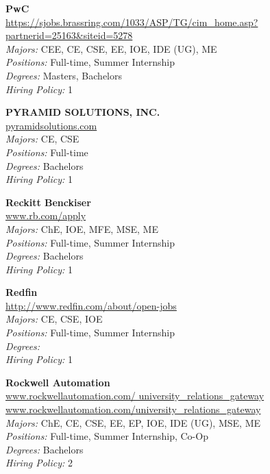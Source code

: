 \documentclass{article}
\begin{document}
\begin{center}
\begin{multicols}{3}
\begin{minipage}{.9\columnwidth}{\Large\bf PwC }\\
	\url{https://sjobs.brassring.com/1033/ASP/TG/cim_home.asp?partnerid=25163&siteid=5278}\\
	\emph{Majors:} CEE, CE, CSE, EE, IOE, IDE (UG), ME\\
	\emph{Positions:} Full-time, Summer Internship\\
	\emph{Degrees:} Masters, Bachelors\\
	\emph{Hiring Policy:} 1\\
\end{minipage}
 
\begin{minipage}{.9\columnwidth}{\Large\bf PYRAMID SOLUTIONS, INC. }\\
	\url{pyramidsolutions.com}\\
	\emph{Majors:} CE, CSE\\
	\emph{Positions:} Full-time\\
	\emph{Degrees:} Bachelors\\
	\emph{Hiring Policy:} 1\\
\end{minipage}
 
\begin{minipage}{.9\columnwidth}{\Large\bf Reckitt Benckiser }\\
	\url{www.rb.com/apply}\\
	\emph{Majors:} ChE, IOE, MFE, MSE, ME\\
	\emph{Positions:} Full-time, Summer Internship\\
	\emph{Degrees:} Bachelors\\
	\emph{Hiring Policy:} 1\\
\end{minipage}
 
\begin{minipage}{.9\columnwidth}{\Large\bf Redfin }\\
	\url{http://www.redfin.com/about/open-jobs}\\
	\emph{Majors:} CE, CSE, IOE\\
	\emph{Positions:} Full-time, Summer Internship\\
	\emph{Degrees:} \\
	\emph{Hiring Policy:} 1\\
\end{minipage}
 
\begin{minipage}{.9\columnwidth}{\Large\bf Rockwell Automation }\\
	\url{www.rockwellautomation.com/ university_relations_gateway www.rockwellautomation.com/university_relations_gateway}\\
	\emph{Majors:} ChE, CE, CSE, EE, EP, IOE, IDE (UG), MSE, ME\\
	\emph{Positions:} Full-time, Summer Internship, Co-Op\\
	\emph{Degrees:} Bachelors\\
	\emph{Hiring Policy:} 2\\
\end{minipage}
 

\end{multicols}
\end{center}
\end{document}
